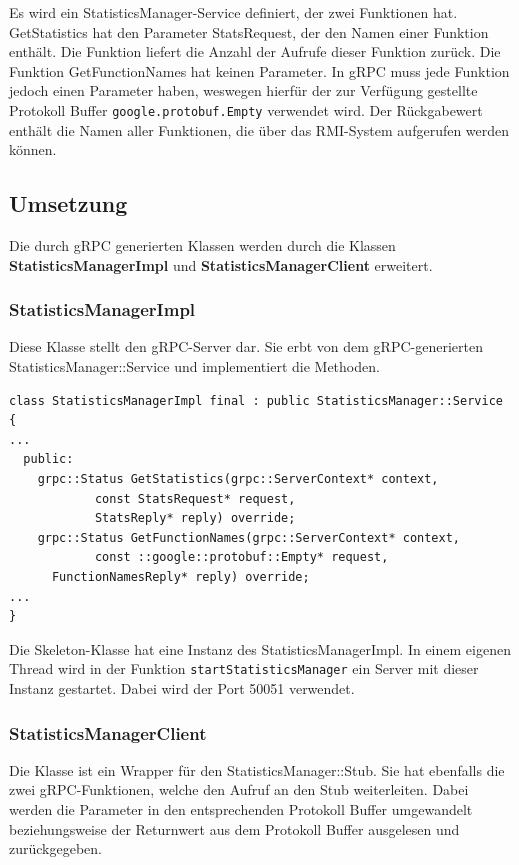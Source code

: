 \documentclass[a4paper,oneside,10pt]{report}
\begin{document}
Es wird ein StatisticsManager-Service definiert, der zwei Funktionen hat. GetStatistics hat den Parameter StatsRequest, der den Namen einer Funktion enthält. Die Funktion liefert die Anzahl der Aufrufe dieser Funktion zurück. Die Funktion GetFunctionNames hat keinen Parameter. In gRPC muss jede Funktion jedoch einen Parameter haben, weswegen hierfür der zur Verfügung gestellte Protokoll Buffer \texttt{google.protobuf.Empty} verwendet wird. Der Rückgabewert enthält die Namen aller Funktionen, die über das RMI-System aufgerufen werden können.

\subsection{Umsetzung}

Die durch gRPC generierten Klassen werden durch die Klassen \textbf{StatisticsManagerImpl} und \textbf{StatisticsManagerClient} erweitert. 

\subsubsection{StatisticsManagerImpl}

Diese Klasse stellt den gRPC-Server dar. Sie erbt von dem gRPC-generierten StatisticsManager::Service und implementiert die Methoden. 

\begin{lstlisting}
class StatisticsManagerImpl final : public StatisticsManager::Service {
...
  public: 
    grpc::Status GetStatistics(grpc::ServerContext* context, 
			const StatsRequest* request,
			StatsReply* reply) override;
    grpc::Status GetFunctionNames(grpc::ServerContext* context, 
			const ::google::protobuf::Empty* request,
      FunctionNamesReply* reply) override;
...
}
\end{lstlisting}

Die Skeleton-Klasse hat eine Instanz des StatisticsManagerImpl. In einem eigenen Thread wird in der Funktion \texttt{startStatisticsManager} ein Server mit dieser Instanz gestartet. Dabei wird der Port 50051 verwendet.

\subsubsection{StatisticsManagerClient}

Die Klasse ist ein Wrapper für den StatisticsManager::Stub. Sie hat ebenfalls die zwei gRPC-Funktionen, welche den Aufruf an den Stub weiterleiten. Dabei werden die Parameter in den entsprechenden Protokoll Buffer umgewandelt beziehungsweise der Returnwert aus dem Protokoll Buffer ausgelesen und zurückgegeben.
\end{document}
